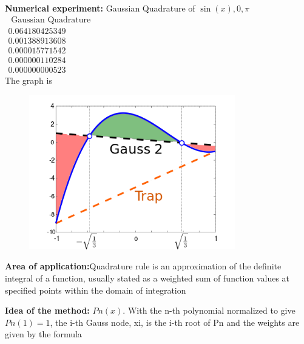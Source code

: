 \documentclass{article}
\begin{document}
{\bf Numerical experiment:}
Gaussian Quadrature of $ \sin(x), 0, \pi $\\$\begin{array} { l } { \text { Gaussian Quadrature } } \\ { 0.064180425349 } \\ { 0.001388913608 } \\ { 0.000015771542 } \\ { 0.000000110284 } \\ { 0.000000000523 } \end{array}$\\
The graph is
\begin{figure}[H]
	\includegraphics[width=0.8\textwidth, height=0.6\textwidth]{g_quad.png}
\end{figure}
{\bf Area of application:}Quadrature rule is an approximation of the definite integral of a function, usually stated as a weighted sum of function values at specified points within the domain of integration

{\bf Idea of the method:} 
$ Pn(x) $. With the n-th polynomial normalized to give $ Pn(1) = 1 $, the i-th Gauss node, xi, is the i-th root of Pn and the weights are given by the formula
\end{document}
